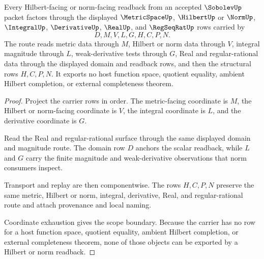 \begin{theorem}
\label{thm:sobolev-hilbert-norm-readback-scope}
Every Hilbert-facing or norm-facing readback from an accepted $\SobolevUp$ packet factors through the displayed $\MetricSpaceUp$, $\HilbertUp$ or $\NormUp$, $\IntegralUp$, $\DerivativeUp$, $\RealUp$, and $\RegSeqRatUp$ rows carried by
$$
D,M,V,L,G,H,C,P,N .
$$
The route reads metric data through $M$, Hilbert or norm data through $V$, integral magnitude through $L$, weak-derivative tests through $G$, Real and regular-rational data through the displayed domain and readback rows, and then the structural rows $H,C,P,N$. It exports no host function space, quotient equality, ambient Hilbert completion, or external completeness theorem.
\end{theorem}
\begin{proof}
Project the carrier rows in order. The metric-facing coordinate is $M$, the Hilbert or norm-facing coordinate is $V$, the integral coordinate is $L$, and the derivative coordinate is $G$.

Read the Real and regular-rational surface through the same displayed domain and magnitude route. The domain row $D$ anchors the scalar readback, while $L$ and $G$ carry the finite magnitude and weak-derivative observations that norm consumers inspect.

Transport and replay are then componentwise. The rows $H,C,P,N$ preserve the same metric, Hilbert or norm, integral, derivative, Real, and regular-rational route and attach provenance and local naming.

Coordinate exhaustion gives the scope boundary. Because the carrier has no row for a host function space, quotient equality, ambient Hilbert completion, or external completeness theorem, none of those objects can be exported by a Hilbert or norm readback.
\end{proof}

